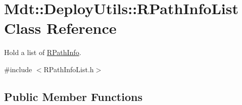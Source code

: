 \hypertarget{class_mdt_1_1_deploy_utils_1_1_r_path_info_list}{}\section{Mdt\+:\+:Deploy\+Utils\+:\+:R\+Path\+Info\+List Class Reference}
\label{class_mdt_1_1_deploy_utils_1_1_r_path_info_list}


Hold a list of \hyperlink{class_mdt_1_1_deploy_utils_1_1_r_path_info}{R\+Path\+Info}.  




{\ttfamily \#include $<$R\+Path\+Info\+List.\+h$>$}

\subsection*{Public Member Functions}
